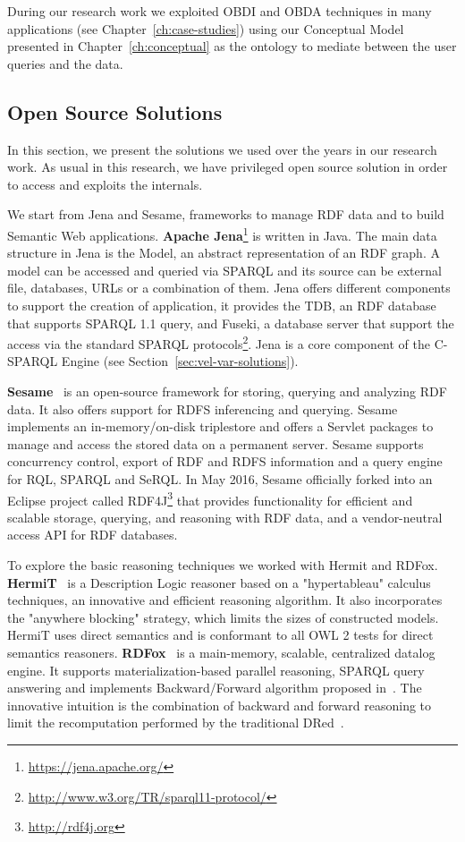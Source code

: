 During our research work we exploited OBDI and OBDA techniques in many applications (see Chapter~\ref{ch:case-studies}) using our Conceptual Model presented in Chapter~\ref{ch:conceptual} as the ontology to mediate between the user queries and the data.

\subsection{Open Source Solutions} \label{sec:var-solutions}
In this section, we present the solutions we used over the years in our research work. As usual in this research, we have privileged open source solution in order to access and exploits the internals.

We start from Jena and Sesame, frameworks to manage RDF data and to build Semantic Web applications.
\textbf{Apache Jena}\footnote{\url{https://jena.apache.org/}} is written in Java.
The main data structure in Jena is the Model, an abstract representation of an RDF graph.
A model can be accessed and queried via SPARQL and its source can be external file, databases, URLs or a combination of them.
Jena offers different components to support the creation of application, it provides the TDB, an RDF database that supports SPARQL 1.1 query, and Fuseki, a database server that support the access via the standard SPARQL protocols\footnote{\url{http://www.w3.org/TR/sparql11-protocol/}}. Jena is a core component of the C-SPARQL Engine (see Section~\ref{sec:vel-var-solutions}).

\textbf{Sesame}~\cite{DBLP:conf/semweb/BroekstraKH02} is an open-source framework for storing, querying and analyzing RDF data. It also offers support for RDFS inferencing and querying.
Sesame implements an in-memory/on-disk triplestore and offers a Servlet packages to manage and access the stored data on a permanent server. 
Sesame supports concurrency control, export of RDF and RDFS information and a query engine for RQL, SPARQL and SeRQL.
In May 2016, Sesame officially forked into an Eclipse project called RDF4J\footnote{\url{http://rdf4j.org}} that provides functionality for efficient and scalable storage, querying, and reasoning with RDF data, and a vendor-neutral access API for RDF databases.

To explore the basic reasoning techniques we worked with Hermit and RDFox. 
\textbf{HermiT}~\cite{DBLP:conf/owled/ShearerMH08} is a Description Logic reasoner based on a "hypertableau" calculus techniques, an innovative and efficient reasoning algorithm. It also incorporates the "anywhere blocking" strategy, which limits the sizes of constructed models.
HermiT uses direct semantics and is conformant to all OWL 2 tests for direct semantics reasoners.
\textbf{RDFox}~\cite{DBLP:conf/semweb/NenovPMHWB15} is a main-memory, scalable, centralized datalog engine. It supports materialization-based parallel reasoning, SPARQL query answering and implements Backward/Forward algorithm proposed in~\cite{DBLP:conf/aaai/MotikNPH15a}.
The innovative intuition is the combination of backward and forward reasoning to limit the recomputation performed by the traditional DRed~\cite{DBLP:journals/jods/VolzSM05}.

